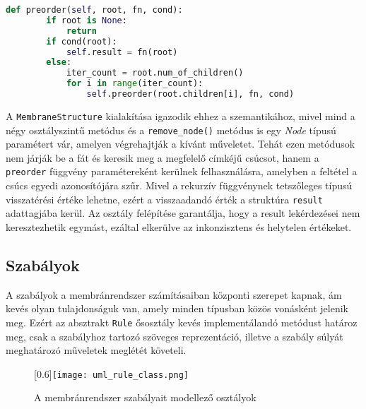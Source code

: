 \begin{lstlisting}[language={Python}]
def preorder(self, root, fn, cond):
        if root is None:
            return
        if cond(root):
            self.result = fn(root)
        else:
            iter_count = root.num_of_children()
            for i in range(iter_count):
                self.preorder(root.children[i], fn, cond)
\end{lstlisting}

A \verb|MembraneStructure| kialakítása igazodik ehhez a szemantikához, mivel mind a négy osztályszintű metódus és a \verb|remove_node()| metódus is egy \textit{Node} típusú paramétert vár, amelyen végrehajtják a kívánt műveletet. Tehát ezen metódusok nem járják be a fát és keresik meg a megfelelő címkéjű csúcsot, hanem a \verb|preorder| függvény paramétereként kerülnek felhasználásra, amelyben a feltétel a csúcs egyedi azonosítójára szűr. Mivel a rekurzív függvénynek tetszőleges típusú visszatérési értéke lehetne, ezért a visszaadandó érték a struktúra \verb|result| adattagjába kerül. Az osztály felépítése garantálja, hogy a result lekérdezései nem keresztezhetik egymást, ezáltal elkerülve az inkonzisztens és helytelen értékeket.

\subsection{Szabályok}

A szabályok a membránrendszer számításaiban központi szerepet kapnak, ám kevés olyan tulajdonságuk van, amely minden típusban közös vonásként jelenik meg. Ezért az absztrakt \verb|Rule| ősosztály kevés implementálandó metódust határoz meg, csak a szabályhoz tartozó szöveges reprezentáció, illetve a szabály súlyát meghatározó műveletek meglétét követeli. 


\begin{figure}[H]
\centering
	\scalebox{0.6}[0.6]{\texttt{[image: uml\_rule\_class.png]}}
	\caption{A membránrendszer szabályait modellező osztályok}
	\label{fig:rule_uml}
\end{figure}

